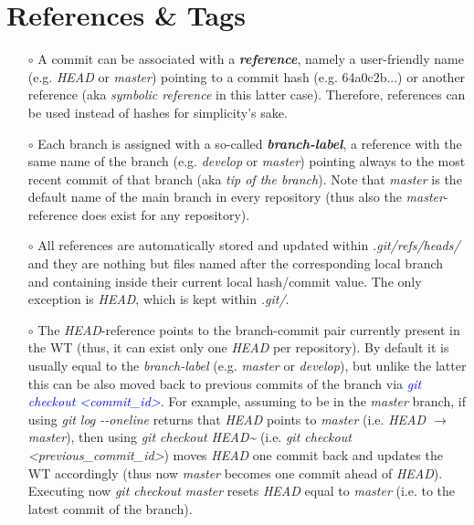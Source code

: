 \documentclass[a4paper,portrait,10pt]{article}   %
\newcommand{\mybulletlvA}{$\circ$}   %
\newcommand{\mycmd}[1]{\textcolor{blue}{\textit{#1}}}   %
\newcommand{\myvspace}{\vspace{4mm}}   %
\begin{document}

\section{References \& Tags}   \label{sec:RefsTags}

\begin{itemize}
\item[\mybulletlvA] A commit can be associated with a \textbf{\textit{reference}}, namely a user-friendly name (e.g. \textit{HEAD} or \textit{master}) pointing to a commit hash (e.g. 64a0c2b...) or another reference (aka \textit{symbolic reference} in this latter case). Therefore, references can be used instead of hashes for simplicity's sake.
\myvspace

\item[\mybulletlvA] Each branch is assigned with a so-called \textbf{\textit{branch-label}}, a reference with the same name of the branch (e.g. \textit{develop} or \textit{master}) pointing always to the most recent commit of that branch (aka \textit{tip of the branch}). Note that \textit{master} is the default name of the main branch in every repository (thus also the \textit{master}-reference does exist for any repository).
\myvspace

\item[\mybulletlvA] All references are automatically stored and updated within \textit{.git/refs/heads/} and they are nothing but files named after the corresponding local branch and containing inside their current local hash/commit value. The only exception is \textit{HEAD}, which is kept within \textit{.git/}.
\myvspace

\item[\mybulletlvA] The \textit{HEAD}-reference points to the branch-commit pair currently present in the WT (thus, it can exist only one \textit{HEAD} per repository). By default it is usually equal to the \textit{branch-label} (e.g. \textit{master} or \textit{develop}), but unlike the latter this can be also moved back to previous commits of the branch via \mycmd{git checkout <commit\_id>}. For example, assuming to be in the \textit{master} branch, if using \textit{git log -{}-oneline} returns that \textit{HEAD} points to \textit{master} (i.e. \textit{HEAD $\rightarrow$ master}), then using \textit{git checkout HEAD\textasciitilde} (i.e. \textit{git checkout <previous\_commit\_id>}) moves \textit{HEAD} one commit back and updates the WT accordingly (thus now \textit{master} becomes one commit ahead of \textit{HEAD}). Executing now \textit{git checkout master} resets \textit{HEAD} equal to \textit{master} (i.e. to the latest commit of the branch).
\myvspace


\end{itemize}
\end{document}
